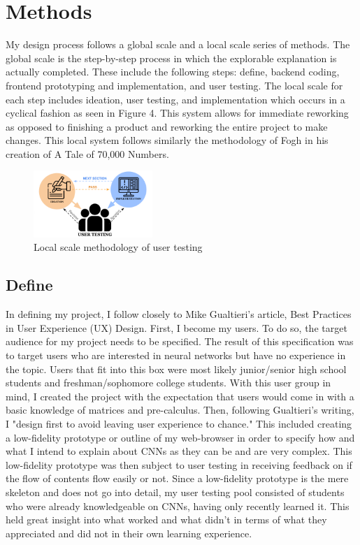 \documentclass[10pt,twocolumn]{article}
\begin{document}
\section{Methods}
My design process follows a global scale and a local scale series of methods. The global scale is the step-by-step process in which the explorable explanation is actually completed. These include the following steps: define, backend coding, frontend prototyping and implementation, and user testing. The local scale for each step includes ideation, user testing, and implementation which occurs in a cyclical fashion as seen in Figure 4. This system allows for immediate reworking as opposed to finishing a product and reworking the entire project to make changes. This local system follows similarly the methodology of Fogh in his creation of A Tale of 70,000 Numbers. \cite{ExplorableExplanation}

\begin{figure}[h]
\caption{Local scale methodology of user testing}
\centering
\includegraphics[width=0.4\textwidth]{./Images/userTesting.png}
\end{figure}

\subsection{Define}
In defining my project, I follow closely to Mike Gualtieri's article, Best Practices in User Experience (UX) Design. First, I become my users. To do so, the target audience for my project needs to be specified. The result of this specification was to target users who are interested in neural networks but have no experience in the topic. Users that fit into this box were most likely junior/senior high school students and freshman/sophomore college students. With this user group in mind, I created the project with the expectation that users would come in with a basic knowledge of matrices and pre-calculus. Then, following Gualtieri's writing, I "design first to avoid leaving user experience to chance." This included creating a low-fidelity prototype or outline of my web-browser in order to specify how and what I intend to explain about CNNs as they can be and are very complex. This low-fidelity prototype was then subject to user testing in receiving feedback on if the flow of contents flow easily or not. Since a low-fidelity prototype is the mere skeleton and does not go into detail, my user testing pool consisted of students who were already knowledgeable on CNNs, having only recently learned it. This held great insight into what worked and what didn't in terms of what they appreciated and did not in their own learning experience. \cite{UXDesignHandbook}
\end{document}
